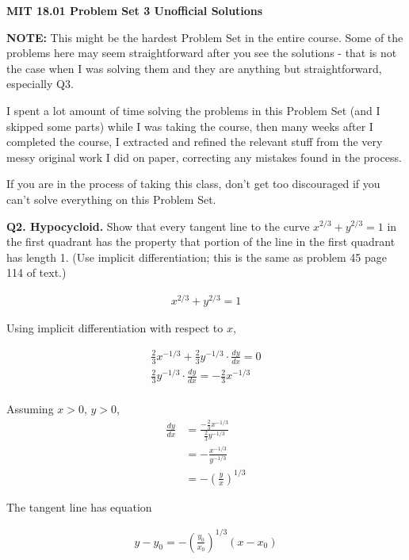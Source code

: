 \documentclass[9pt]{article}
\begin{document}
\begin{center}
  \large\textbf{MIT 18.01 Problem Set 3 Unofficial Solutions}
\end{center}

\textbf{NOTE:} This might be the hardest Problem Set in the entire course. Some of the problems here may seem straightforward after you see the solutions - that is not the case when I was solving them and they are anything but straightforward, especially Q3.

I spent a lot amount of time solving the problems in this Problem Set (and I skipped some parts) while I was taking the course, then many weeks after I completed the course, I extracted and refined the relevant stuff from the very messy original work I did on paper, correcting any mistakes found in the process.

If you are in the process of taking this class, don't get too discouraged if you can't solve everything on this Problem Set.

\begin{tcolorbox}
  \textbf{Q2. Hypocycloid.} Show that every tangent line to the curve \( x^{2/3} + y^{2/3} = 1 \) in the first quadrant has the property that portion of the line in the first quadrant has length 1. (Use implicit differentiation; this is the same as problem 45 page 114 of text.)
\end{tcolorbox}

\begin{align*}
  x^{2/3} + y^{2/3} = 1
\end{align*}

Using implicit differentiation with respect to $x$,

\begin{align*}
  \frac{2}{3}x^{-1/3} + \frac{2}{3}y^{-1/3} \cdot \frac{dy}{dx} = 0 \\
  \frac{2}{3}y^{-1/3} \cdot \frac{dy}{dx} = -\frac{2}{3}x^{-1/3} \\
\end{align*}

Assuming $x > 0$, $y > 0$,
\begin{align*}
  \frac{dy}{dx} &= \frac{-\frac{2}{3}x^{-1/3}}{\frac{2}{3}y^{-1/3}} \\
                &= -\frac{x^{-1/3}}{y^{-1/3}} \\
                &= - (\frac{y}{x})^{1/3}
\end{align*}

The tangent line has equation

\begin{align*}
  y - y_0 = -(\frac{y_0}{x_0})^{1/3} (x - x_0)
\end{align*}
\end{document}
